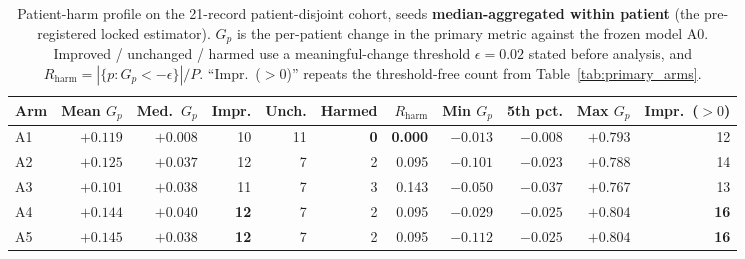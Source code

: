 \begin{table}[H]
\centering
\small
\caption{Patient-harm profile on the 21-record patient-disjoint cohort, seeds \textbf{median-aggregated within patient} (the pre-registered locked estimator). $G_p$ is the per-patient change in the primary metric against the frozen model A0. Improved / unchanged / harmed use a meaningful-change threshold $\epsilon = 0.02$ stated before analysis, and $R_{\mathrm{harm}} = |\{p : G_p < -\epsilon\}| / P$. ``Impr.\ ($>0$)'' repeats the threshold-free count from Table~\ref{tab:primary_arms}.}
\label{tab:harm}
\setlength{\tabcolsep}{4pt}
\begin{tabular}{lrrrrrrrrrr}
\toprule
Arm & Mean $G_p$ & Med.\ $G_p$ & Impr. & Unch. & Harmed & $R_{\mathrm{harm}}$ & Min $G_p$ & 5th pct. & Max $G_p$ & Impr.\ ($>0$) \\
\midrule
A1 & $+0.119$ & $+0.008$ & 10 & 11 & \textbf{0} & \textbf{0.000} & $-0.013$ & $-0.008$ & $+0.793$ & 12 \\
A2 & $+0.125$ & $+0.037$ & 12 & 7 & 2 & 0.095 & $-0.101$ & $-0.023$ & $+0.788$ & 14 \\
A3 & $+0.101$ & $+0.038$ & 11 & 7 & 3 & 0.143 & $-0.050$ & $-0.037$ & $+0.767$ & 13 \\
A4 & $+0.144$ & $+0.040$ & \textbf{12} & 7 & 2 & 0.095 & $\mathbf{-0.029}$ & $-0.025$ & $+0.804$ & \textbf{16} \\
A5 & $+0.145$ & $+0.038$ & \textbf{12} & 7 & 2 & 0.095 & $-0.112$ & $-0.025$ & $+0.804$ & \textbf{16} \\
\bottomrule
\end{tabular}
\end{table}
